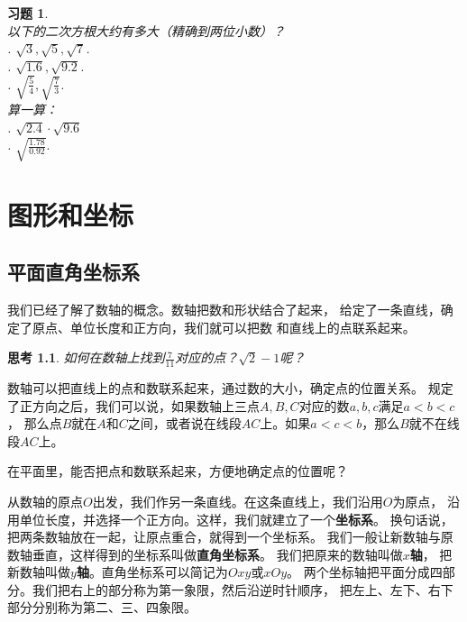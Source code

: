 \documentclass[12pt,UTF8]{ctexbook}
\newtheorem{sk}{思考}[section]
\newtheorem{xt}{习题}[section]
\begin{document}
\begin{xt}\label{xt:3-2-0}
    \mbox{}\\
    以下的二次方根大约有多大（精确到两位小数）？\\
    . $\sqrt{3}, \sqrt{5}, \sqrt{7}$.\\
    . $\sqrt{1.6}, \sqrt{9.2}$.\\
    . $\sqrt{\frac{5}{4}}, \sqrt{\frac{7}{3}}$.\\
    算一算：\\
    . $\sqrt{2.4} \cdot \sqrt{9.6}$\\
    . $\sqrt{\frac{1.78}{0.92}}.$
\end{xt}

\chapter{图形和坐标}
\section{平面直角坐标系}
我们已经了解了数轴的概念。数轴把数和形状结合了起来，
给定了一条直线，确定了原点、单位长度和正方向，我们就可以把数
和直线上的点联系起来。

\begin{sk}\label{sk:4-0-0}
    如何在数轴上找到$\frac{7}{11}$对应的点？$\sqrt{2} - 1$呢？
\end{sk}

数轴可以把直线上的点和数联系起来，通过数的大小，确定点的位置关系。
规定了正方向之后，我们可以说，如果数轴上三点$A,B,C$对应的数$a,b,c$满足$a < b < c$，
那么点$B$就在$A$和$C$之间，或者说在线段$AC$上。如果$a < c < b$，那么$B$就不在线段$AC$上。

在平面里，能否把点和数联系起来，方便地确定点的位置呢？

从数轴的原点$O$出发，我们作另一条直线。在这条直线上，我们沿用$O$为原点，
沿用单位长度，并选择一个正方向。这样，我们就建立了一个\textbf{坐标系}。
换句话说，把两条数轴放在一起，让原点重合，就得到一个坐标系。
我们一般让新数轴与原数轴垂直，这样得到的坐标系叫做\textbf{直角坐标系}。
我们把原来的数轴叫做$x$\textbf{轴}，
把新数轴叫做$y$\textbf{轴}。直角坐标系可以简记为$Oxy$或$xOy$。
两个坐标轴把平面分成四部分。我们把右上的部分称为第一象限，然后沿逆时针顺序，
把左上、左下、右下部分分别称为第二、三、四象限。
\end{document}

